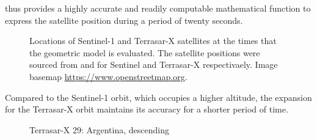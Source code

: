 \par
{} thus provides a highly accurate and readily computable mathematical function to express the satellite position during a period of twenty seconds. 
\begin{figure}
	\caption{Locations of Sentinel-1 and Terrasar-X  satellites at the times that the geometric model is evaluated. The satellite positions were sourced from \cite{SentinelPOD} and \cite{GFZ} for Sentinel and Terrasar-X respectivaely. Image basemap \textcopyright \url{https://www.openstreetmap.org}.}
	\label{fg:orbitMap}
\end{figure}
Compared to the Sentinel-1 orbit, which occupies a higher altitude, the expansion for the Terrasar-X orbit maintains its accuracy for a shorter period of time.
\begin{figure}[ht]
\begin{subfigure}{.5\textwidth}
  \centering
  \resizebox{\textwidth}{!}{}  
  \label{fg:29a}
\end{subfigure}
\begin{subfigure}{.5\textwidth}
  \centering
  \resizebox{\textwidth}{!}{} 
  \label{fg:29b}
\end{subfigure} 
\caption{Terrasar-X 29: Argentina, descending}
\label{fg:29}
\end{figure}
